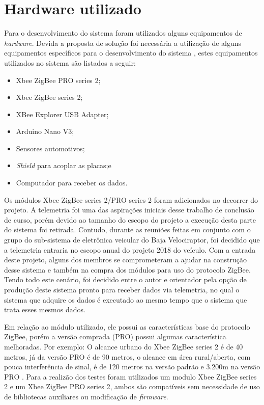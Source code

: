 \section{Hardware utilizado}
\label{sec:hardwareutilizado}

Para o desenvolvimento do sistema foram utilizados alguns equipamentos de \textit{hardware}. Devida a proposta de solução foi necessária a utilização de alguns equipamentos específicos para o desenvolvimento do sistema , estes equipamentos utilizados no sistema são listados a seguir:

\begin{itemize}
	\item Xbee ZigBee PRO series 2;
	\item Xbee ZigBee series 2;
	\item XBee Explorer USB Adapter;
	\item Arduino Nano V3;
	\item Sensores automotivos;
	\item \textit{Shield} para acoplar as placas;e
	\item Computador para receber os dados. 
\end{itemize}  

Os módulos Xbee ZigBee series 2/PRO series 2 \cite{xbeeuserguide} foram adicionados no decorrer do projeto. A telemetria foi uma das aspirações iniciais desse trabalho de conclusão de curso, porém devido ao tamanho do escopo do projeto a execução desta parte do sistema foi retirada. Contudo, durante as reuniões feitas em conjunto com o grupo do sub-sistema de eletrônica veicular do Baja Velociraptor, foi decidido que a telemetria entraria no escopo anual do projeto 2018 do veículo. Com a entrada deste projeto, alguns dos membros se comprometeram a ajudar na construção desse sistema e também na compra dos módulos para uso do protocolo ZigBee. Tendo todo este cenário, foi decidido entre o autor e orientador pela opção de produção deste sistema pronto para receber dados via telemetria, no qual o sistema que adquire os dados é executado ao mesmo tempo que o sistema que trata esses mesmos dados. 

Em relação ao módulo utilizado, ele possui as características base do protocolo ZigBee, porém a versão comprada (PRO) possui algumas característica melhoradas. Por exemplo: O alcance urbano do Xbee ZigBee series 2 é de 40 metros, já da versão PRO é de 90 metros, o alcance em área rural/aberta, com pouca interferência de sinal, é de 120 metros na versão padrão e 3.200m na versão PRO \cite{xbeespecs}. Para a realizão dos testes foram utilizados um modulo Xbee ZigBee series 2 e um Xbee ZigBee PRO series 2, ambos são compatíveis sem necessidade de uso de bibliotecas auxiliares ou modificação de \textit{firmware}.

